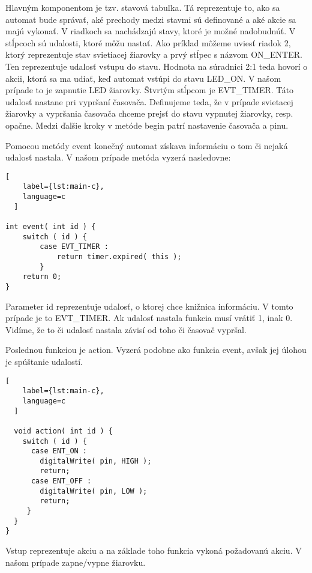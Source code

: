 Hlavným komponentom je tzv. stavová tabuľka. Tá reprezentuje to, ako sa automat bude správať, aké prechody medzi stavmi sú definované a aké akcie sa majú vykonať.
V riadkoch sa nachádzajú stavy, ktoré je možné nadobudnúť. V stĺpcoch sú udalosti, ktoré môžu nastať.
Ako príklad môžeme uviesť riadok 2, ktorý reprezentuje stav svietiacej žiarovky a prvý stĺpec s názvom ON\_ENTER. Ten reprezentuje udalosť vstupu do stavu.
Hodnota na súradnici 2:1 teda hovorí o  akcii, ktorá sa ma udiať, keď automat vstúpi do stavu LED\_ON. V našom prípade to je zapnutie LED žiarovky.
Štvrtým stĺpcom je EVT\_TIMER. Táto udalosť nastane pri vypršaní časovača. Definujeme teda, že v prípade svietacej žiarovky a vypršania časovača chceme prejsť do stavu vypnutej žiarovky, resp. opačne.  Medzi ďalšie kroky v metóde begin patrí nastavenie časovača a pinu.
\par Pomocou metódy event konečný automat získava informáciu o tom či nejaká udalosť nastala. V našom prípade metóda vyzerá nasledovne:
\begin{lstlisting}[
    label={lst:main-c},
    language=c
  ]

int event( int id ) {
    switch ( id ) {
        case EVT_TIMER :
            return timer.expired( this );        
        }
    return 0;
}
\end{lstlisting}
Parameter id reprezentuje udalosť, o ktorej chce knižnica informáciu. V tomto prípade je to EVT\_TIMER. Ak udalosť nastala funkcia musí vrátiť 1, inak 0. Vidíme, že to či udalosť nastala závisí od toho či časovač vypršal.
\par Poslednou funkciou je action. Vyzerá podobne ako funkcia event, avšak jej úlohou je spúštanie udalostí.
\begin{lstlisting}[
    label={lst:main-c},
    language=c
  ]

  void action( int id ) {
    switch ( id ) {
      case ENT_ON :
        digitalWrite( pin, HIGH );
        return;
      case ENT_OFF :
        digitalWrite( pin, LOW );
        return;
     }
  }
}
\end{lstlisting}
Vstup reprezentuje akciu a na základe toho funkcia vykoná požadovanú akciu. V našom prípade zapne/vypne žiarovku.

